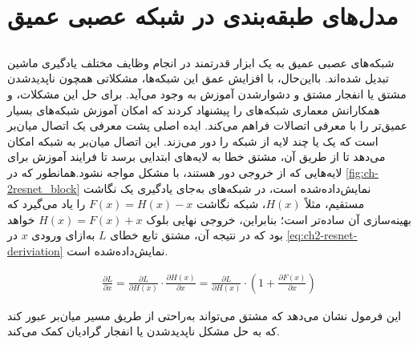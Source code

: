 \section{مدل‌های طبقه‌بندی در شبکه عصبی عمیق}

\subsection{}
\label{ResNet subsection}
شبکه‌های عصبی عمیق به یک ابزار قدرتمند در انجام وظایف مختلف یادگیری ماشین تبدیل شده‌اند. بااین‌حال، با افزایش عمق این شبکه‌ها، مشکلاتی همچون ناپدیدشدن مشتق
یا انفجار مشتق 
 و دشوارشدن آموزش به ‌وجود می‌آید. برای حل این مشکلات،
  \cite{he2016deep}
   و همکارانش معماری شبکه‌های 
   را پیشنهاد کردند که امکان آموزش شبکه‌های بسیار عمیق‌تر را با معرفی اتصالات 
   فراهم می‌کند.
ایده اصلی پشت 
 معرفی یک اتصال  میان‌بر
 است که یک یا چند لایه از شبکه را دور می‌زند. این اتصال  میان‌بر به شبکه امکان می‌دهد تا از طریق آن، مشتق خطا به لایه‌های ابتدایی برسد تا فرایند آموزش برای لایه‌هایی که از خروجی دور هستند، با مشکل مواجه نشود.همانطور که در 
 \autoref{fig:ch-2resnet_block}
 نمایش‌داده‌‌شده است، در شبکه‌های 
 به‌جای یادگیری یک نگاشت مستقیم، مثلاً $H(x)$، شبکه نگاشت $F(x) = H(x) - x$ را یاد می‌گیرد که بهینه‌سازی آن ساده‌تر است؛ بنابراین، خروجی نهایی بلوک
  $H(x) = F(x) + x$ خواهد بود که در نتیجه آن، مشتق
 تابع خطای $L$ به‌ازای ورودی $x$ در 
 \autoref{eq:ch2-resnet-deriviation}
 نمایش‌‌داده‌شده است.
 
\begin{latin}
\begin{equation}
\label{eq:ch2-resnet-deriviation}
\begin{aligned}
 \frac{\partial L}{\partial x} = \frac{\partial L}{\partial H(x)} \cdot \frac{\partial H(x)}{\partial x} = \frac{\partial L}{\partial H(x)} \cdot \left(1 + \frac{\partial F(x)}{\partial x}\right)
\end{aligned}
\end{equation}
\end{latin}

 
 این فرمول نشان می‌دهد که مشتق می‌تواند به‌راحتی از طریق مسیر  میان‌بر عبور کند که به حل مشکل ناپدیدشدن یا انفجار گرادیان کمک می‌کند.
 
